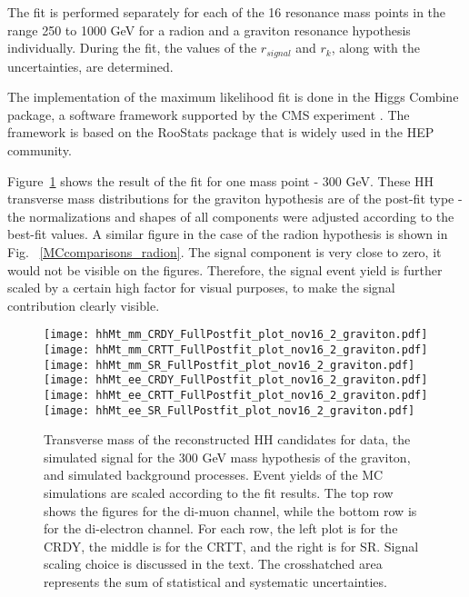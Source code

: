 The fit is performed separately for each of the 16 resonance mass points in the range 250 to 1000 GeV for a radion and a graviton resonance hypothesis individually. During the fit, the values of the $r_{signal}$ and $r_k$, along with the uncertainties, are determined. 

The implementation of the maximum likelihood fit is done in the Higgs Combine package, a software framework supported by the CMS experiment \cite{HiggsCombine}. The framework is based on the RooStats package \cite{RooStats} that is widely used in the HEP community. 

Figure~\ref{MCcomparisons} shows the result of the fit for one mass point - 300 GeV. These HH transverse mass distributions for the graviton hypothesis are of the post-fit type - the normalizations and shapes of all components were adjusted according to the best-fit values. A similar figure in the case of the radion hypothesis is shown in Fig. ~\ref{MCcomparisons_radion}. The signal component is very close to zero, it would not be visible on the figures. Therefore, the signal event yield is further scaled by a certain high factor for visual purposes, to make the signal contribution clearly visible. 

\begin{figure}[H]
\begin{center}
\texttt{[image: hhMt\_mm\_CRDY\_FullPostfit\_plot\_nov16\_2\_graviton.pdf]}
\texttt{[image: hhMt\_mm\_CRTT\_FullPostfit\_plot\_nov16\_2\_graviton.pdf]}
\texttt{[image: hhMt\_mm\_SR\_FullPostfit\_plot\_nov16\_2\_graviton.pdf]} \\
\texttt{[image: hhMt\_ee\_CRDY\_FullPostfit\_plot\_nov16\_2\_graviton.pdf]}
\texttt{[image: hhMt\_ee\_CRTT\_FullPostfit\_plot\_nov16\_2\_graviton.pdf]}
\texttt{[image: hhMt\_ee\_SR\_FullPostfit\_plot\_nov16\_2\_graviton.pdf]}
\caption[Transverse mass of the reconstructed HH candidates for graviton hypothesis.]{Transverse mass of the reconstructed HH candidates for data, the simulated signal for the 300 GeV mass hypothesis of the graviton, and simulated background processes. Event yields of the MC simulations are scaled according to the fit results. The top row shows the figures for the di-muon channel, while the bottom row is for the di-electron channel. For each row, the left plot is for the CRDY, the middle is for the CRTT, and the right is for SR. Signal scaling choice is discussed in the text. The crosshatched area represents the sum of statistical and systematic uncertainties.
\label{MCcomparisons} } 
\end{center}
\end{figure}

